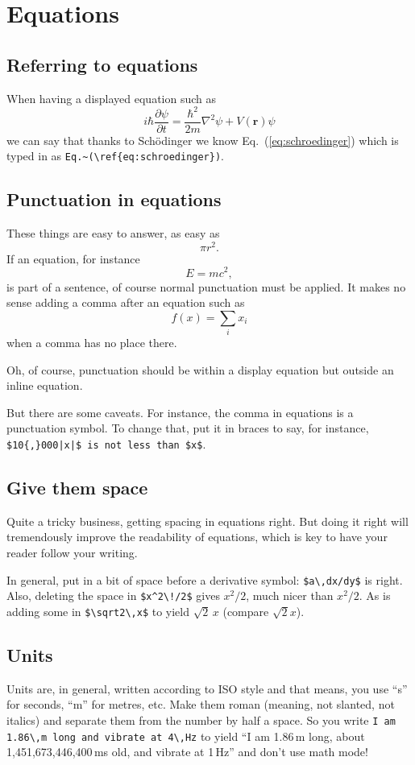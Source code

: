 \documentclass{article}
\begin{document}
\section{Equations}
\subsection{Referring to equations}\label{sec:refereq}
When having a displayed equation such as
\begin{equation}\label{eq:schroedinger}
i\hbar\frac{\partial\psi}{\partial t} = \frac{\hbar^2}{2m}\nabla^2\psi + V(\mathbf{r})\psi
\end{equation}
we can say that thanks to Sch\"odinger we know Eq.~(\ref{eq:schroedinger}) which
is typed in as \verb+Eq.~(\ref{eq:schroedinger})+.

\subsection{Punctuation in equations}

These things are easy to answer, as easy as
$$ \pi r^2.$$
If an equation, for instance
$$ E = m c^2, $$
is part of a sentence, of course normal punctuation must be applied.  It makes no sense adding a comma after an equation such as 
$$ f(x) = \sum_i x_i $$
when a comma has no place there.

Oh, of course, punctuation should be within a display equation but outside an inline equation.

But there are some caveats.  For instance, the comma in equations is a punctuation symbol.
To change that, put it in braces to say, for instance, \verb+$10{,}000|x|$ is not less than $x$+.

\subsection{Give them space}
Quite a tricky business, getting spacing in equations right.  But doing it right will tremendously
improve the readability of equations, which is key to have your reader follow your writing.

In general, put in a bit of space before a derivative symbol: \verb+$a\,dx/dy$+ is right.
Also, deleting the space in \verb+$x^2\!/2$+ gives $x^2\!/2$, much nicer than $x^2/2$.
As is adding some in \verb+$\sqrt2\,x$+ to yield $\sqrt2\,x$ (compare $\sqrt2x$).

\subsection{Units}
Units are, in general, written according to ISO style and that means, you use ``s'' for seconds, ``m'' for metres, etc.  Make them roman (meaning, not slanted, not italics) and separate them from the number by half a space.  So you write \verb+I am 1.86\,m long and vibrate at 4\,Hz+ to yield ``I am 1.86\,m long, about 1,451,673,446,400\,ms old, and vibrate at 1\,Hz'' and don't use math mode!  
\end{document}
